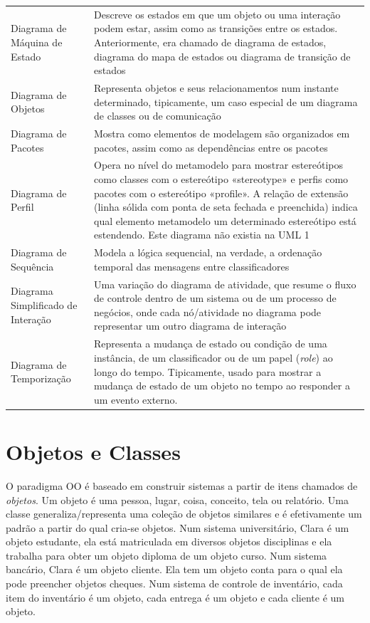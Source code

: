 \begin{longtable}[l]{p{4.7cm}p{11cm}}
Diagrama de Máquina de Estado & Descreve os estados em que um objeto ou uma interação podem estar, assim como as transições entre os estados. Anteriormente, era chamado de diagrama de estados, diagrama do mapa de estados ou diagrama de transição de estados  \\

Diagrama de Objetos & Representa objetos e seus relacionamentos num instante determinado, tipicamente, um caso especial de um diagrama de classes ou de comunicação \\

Diagrama de Pacotes & Mostra como elementos de modelagem são organizados em pacotes, assim como as dependências entre os pacotes \\

Diagrama de Perfil & Opera no nível do metamodelo para mostrar estereótipos como classes com o estereótipo «stereotype» e perfis como pacotes com o estereótipo «profile». A relação de extensão (linha sólida com ponta de seta fechada e preenchida) indica qual elemento metamodelo um determinado estereótipo está estendendo. Este diagrama não existia na UML 1 \\

Diagrama de Sequência & Modela a lógica sequencial, na verdade, a ordenação temporal das mensagens entre classificadores \\

Diagrama Simplificado de Interação & Uma variação do diagrama de atividade, que resume o fluxo de controle dentro de um sistema ou de um processo de negócios, onde cada nó/atividade no diagrama pode representar um outro diagrama de interação \\

Diagrama de Temporização & Representa a mudança de estado ou condição de uma instância, de um classificador ou de um papel (\textit{role}) ao longo do tempo. Tipicamente, usado para mostrar a mudança de estado de um objeto no tempo ao responder a um evento externo. \\

\end{longtable}

\section{Objetos e Classes}

O paradigma OO é baseado em construir sistemas a partir de itens chamados de \emph{objetos}. Um objeto é uma pessoa, lugar, coisa, conceito, tela ou relatório. Uma classe generaliza/representa uma coleção de objetos similares e é efetivamente um padrão a partir do qual cria-se objetos. Num sistema universitário, Clara é um objeto estudante, ela está matriculada em diversos objetos disciplinas e ela trabalha para obter um objeto diploma de um objeto curso. Num sistema bancário, Clara é um objeto cliente. Ela tem um objeto conta para o qual ela pode preencher objetos cheques. Num sistema de controle de inventário, cada item do inventário é um objeto, cada entrega é um objeto e cada cliente é um objeto.

